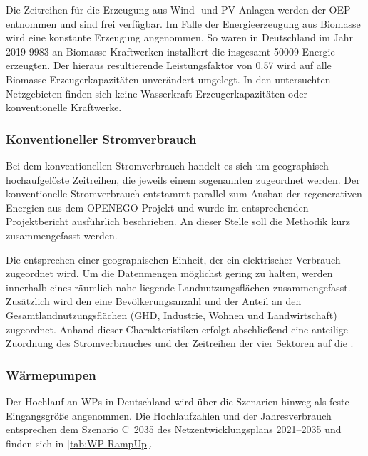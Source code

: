 

Die Zeitreihen für die Erzeugung aus Wind- und \gls{PV}-Anlagen werden der \gls{OEP} \cite{OEP} entnommen und sind frei verfügbar.
Im Falle der Energieerzeugung aus Biomasse wird eine konstante Erzeugung angenommen.
So waren in Deutschland im Jahr \num{2019} \SI{9983}{\mw} an Biomasse-Kraftwerken installiert die insgesamt \SI{50009}{\gwh} Energie erzeugten. \cite{BMWi2020}
Der hieraus resultierende Leistungsfaktor von \num{0.57} wird auf alle Biomasse-Erzeugerkapazitäten unverändert umgelegt.
In den untersuchten Netzgebieten finden sich keine Wasserkraft-Erzeugerkapazitäten oder konventionelle Kraftwerke.


\subsubsection{Konventioneller Stromverbrauch}

Bei dem konventionellen Stromverbrauch handelt es sich um geographisch hochaufgelöste Zeitreihen, die jeweils einem sogenannten \Lastgebiet zugeordnet werden.
Der konventionelle Stromverbrauch entstammt parallel zum Ausbau der regenerativen Energien aus dem \gls{OPENEGO} Projekt und wurde im entsprechenden Projektbericht \cite{Mueller2019} ausführlich beschrieben.
An dieser Stelle soll die Methodik kurz zusammengefasst werden.\medskip

Die \Lastgebiete entsprechen einer geographischen Einheit, der ein elektrischer Verbrauch zugeordnet wird.
Um die Datenmengen möglichst gering zu halten, werden innerhalb eines \Lastgebietes räumlich nahe liegende Landnutzungsflächen zusammengefasst.
Zusätzlich wird den \Lastgebieten eine Bevölkerungsanzahl und der Anteil an den Gesamtlandnutzungsflächen (\gls{GHD}, Industrie, Wohnen und Landwirtschaft) zugeordnet.
Anhand dieser Charakteristiken erfolgt abschließend eine anteilige Zuordnung des Stromverbrauches und der Zeitreihen der vier Sektoren auf die \Lastgebietedot.


\subsubsection{Wärmepumpen}

Der Hochlauf an \glspl{WP} in Deutschland wird über die Szenarien hinweg als feste Eingangsgröße angenommen.
Die Hochlaufzahlen und der Jahresverbrauch entsprechen dem Szenario C~\num{2035} des Netzentwicklungsplans \numrange[range-phrase=~{--}~]{2021}{2035} \cite{BNetzA2020} und finden sich in \autoref{tab:WP-RampUp}.

